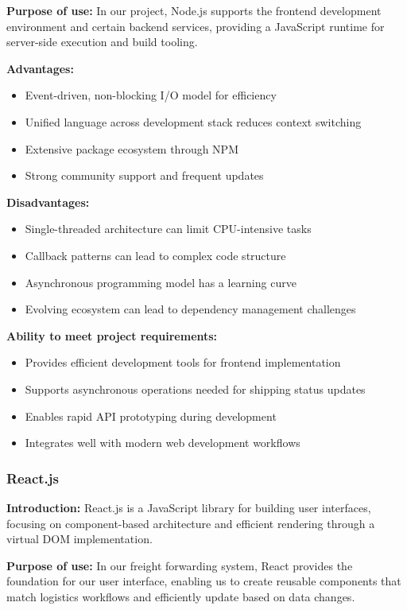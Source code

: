 \textbf{Purpose of use:} In our project, Node.js supports the frontend development environment and certain backend services, providing a JavaScript runtime for server-side execution and build tooling.

\textbf{Advantages:}
\begin{itemize}
    \item Event-driven, non-blocking I/O model for efficiency
    \item Unified language across development stack reduces context switching
    \item Extensive package ecosystem through NPM
    \item Strong community support and frequent updates
\end{itemize}

\textbf{Disadvantages:}
\begin{itemize}
    \item Single-threaded architecture can limit CPU-intensive tasks
    \item Callback patterns can lead to complex code structure
    \item Asynchronous programming model has a learning curve
    \item Evolving ecosystem can lead to dependency management challenges
\end{itemize}

\textbf{Ability to meet project requirements:}
\begin{itemize}
    \item Provides efficient development tools for frontend implementation
    \item Supports asynchronous operations needed for shipping status updates
    \item Enables rapid API prototyping during development
    \item Integrates well with modern web development workflows
\end{itemize}

\subsubsection{React.js}
\textbf{Introduction:} React.js \cite{reactjs} is a JavaScript library for building user interfaces, focusing on component-based architecture and efficient rendering through a virtual DOM implementation.

\textbf{Purpose of use:} In our freight forwarding system, React provides the foundation for our user interface, enabling us to create reusable components that match logistics workflows and efficiently update based on data changes.

